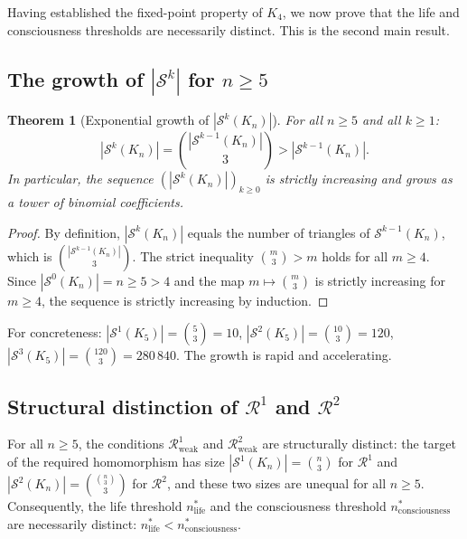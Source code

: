 \documentclass[12pt,a4paper]{article}
\newenvironment{theorembox}[1][]{%
  \begin{tcolorbox}[theoremstyle,title={Theorem%
    \ifx\relax#1\relax\else: #1\fi}]}{\end{tcolorbox}}
\theoremstyle{plain}
\newtheorem{theorem}{Theorem}[section]
\theoremstyle{definition}
\theoremstyle{remark}
\newcommand{\Kfour}{K_4}
\newcommand{\Sop}{\mathcal{S}}
\newcommand{\Rop}{\mathcal{R}}
\newcommand{\nlife}{n^{*}_{\mathrm{life}}}
\newcommand{\ncons}{n^{*}_{\mathrm{consciousness}}}
\begin{document}
Having established the fixed-point property of $\Kfour$, we now prove that the life
and consciousness thresholds are necessarily distinct. This is the second main result.

\subsection{The growth of \texorpdfstring{$|\Sop^k|$}{|Sk|} for \texorpdfstring{$n \geq 5$}{n≥5}}

\begin{theorem}[Exponential growth of $|\Sop^k(K_n)|$]
\label{thm:growth}
For all $n \geq 5$ and all $k \geq 1$:
\begin{equation}
|\Sop^k(K_n)| = \binom{|\Sop^{k-1}(K_n)|}{3} > |\Sop^{k-1}(K_n)|.
\end{equation}
In particular, the sequence $\left(|\Sop^k(K_n)|\right)_{k \geq 0}$ is strictly
increasing and grows as a tower of binomial coefficients.
\end{theorem}

\begin{proof}
By definition, $|\Sop^k(K_n)|$ equals the number of triangles of $\Sop^{k-1}(K_n)$,
which is $\binom{|\Sop^{k-1}(K_n)|}{3}$. The strict inequality
$\binom{m}{3} > m$ holds for all $m \geq 4$. Since $|\Sop^0(K_n)| = n \geq 5 > 4$
and the map $m \mapsto \binom{m}{3}$ is strictly increasing for $m \geq 4$, the
sequence is strictly increasing by induction.
\end{proof}

For concreteness: $|\Sop^1(K_5)| = \binom{5}{3} = 10$, $|\Sop^2(K_5)| = \binom{10}{3} =
120$, $|\Sop^3(K_5)| = \binom{120}{3} = 280\,840$. The growth is rapid and accelerating.

\subsection{Structural distinction of \texorpdfstring{$\Rop^1$}{R1} and \texorpdfstring{$\Rop^2$}{R2}}

\begin{theorembox}[Separation of $\nlife$ and $\ncons$]
\label{thm:separation}
For all $n \geq 5$, the conditions $\Rop^1_{\mathrm{weak}}$ and
$\Rop^2_{\mathrm{weak}}$ are structurally distinct: the target of the required
homomorphism has size $|\Sop^1(K_n)| = \binom{n}{3}$ for $\Rop^1$ and
$|\Sop^2(K_n)| = \binom{\binom{n}{3}}{3}$ for $\Rop^2$, and these two sizes are
unequal for all $n \geq 5$. Consequently, the life threshold $\nlife$ and the
consciousness threshold $\ncons$ are necessarily distinct: $\nlife < \ncons$.
\end{theorembox}
\end{document}
